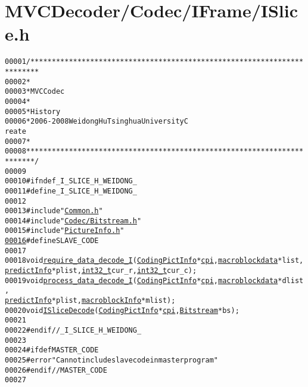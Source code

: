 \hypertarget{_i_slice_8h_source}{
\section{MVCDecoder/Codec/IFrame/ISlice.h}
}


\begin{footnotesize}\begin{alltt}
00001 \textcolor{comment}{/************************************************************************}
00002 \textcolor{comment}{ *}
00003 \textcolor{comment}{ * MVC Codec}
00004 \textcolor{comment}{ * }
00005 \textcolor{comment}{ * History}
00006 \textcolor{comment}{ * 2006-2008            Weidong Hu              Tsinghua University             C
      reate}
00007 \textcolor{comment}{ * }
00008 \textcolor{comment}{ ************************************************************************/}
00009 
00010 \textcolor{preprocessor}{#ifndef \_I\_SLICE\_H\_WEIDONG\_}
00011 \textcolor{preprocessor}{}\textcolor{preprocessor}{#define \_I\_SLICE\_H\_WEIDONG\_}
00012 \textcolor{preprocessor}{}
00013 \textcolor{preprocessor}{#include "\hyperlink{_common_8h}{Common.h}"}
00014 \textcolor{preprocessor}{#include "\hyperlink{_bitstream_8h}{Codec/Bitstream.h}"}
00015 \textcolor{preprocessor}{#include "\hyperlink{_picture_info_8h}{PictureInfo.h}"}
\hypertarget{_i_slice_8h_source_l00016}{}\hyperlink{_i_slice_8h_a995f6a4907273b8d56b6543ab1a57d17}{00016} \textcolor{preprocessor}{#define SLAVE\_CODE}
00017 \textcolor{preprocessor}{}
00018 \textcolor{keywordtype}{void} \hyperlink{_i_slice_8cpp_a62bde0c28d855f00622a319f1be6dfd2}{require_data_decode_I}(\hyperlink{struct_coding_pict_info}{CodingPictInfo} *\hyperlink{structtag__macroblock__info_ae7a0c6b68c7cbc0ffb1a82799eb386ef}{cpi}, \hyperlink{structmacroblockdata}{macroblockdata} *list, 
      \hyperlink{structpredict_info}{predictInfo} *plist, \hyperlink{_types_8h_a115ba3a1b24a8702355c5dbd61ce01e0}{int32_t} cur\_r, \hyperlink{_types_8h_a115ba3a1b24a8702355c5dbd61ce01e0}{int32_t} cur\_c);
00019 \textcolor{keywordtype}{void} \hyperlink{_i_slice_8cpp_a23c43acab8cba26c6a4938028715f817}{process_data_decode_I}(\hyperlink{struct_coding_pict_info}{CodingPictInfo} *\hyperlink{structtag__macroblock__info_ae7a0c6b68c7cbc0ffb1a82799eb386ef}{cpi}, \hyperlink{structmacroblockdata}{macroblockdata} *dlist, 
      \hyperlink{structpredict_info}{predictInfo} *plist, \hyperlink{structmacroblock_info}{macroblockInfo} *mlist);
00020 \textcolor{keywordtype}{void} \hyperlink{_i_slice_8cpp_a3d8b6dcdaff59baf9c7b27ae426f0a5a}{ISliceDecode}(\hyperlink{struct_coding_pict_info}{CodingPictInfo} *\hyperlink{structtag__macroblock__info_ae7a0c6b68c7cbc0ffb1a82799eb386ef}{cpi}, \hyperlink{struct_bitstream}{Bitstream} *bs);
00021 
00022 \textcolor{preprocessor}{#endif //\_I\_SLICE\_H\_WEIDONG\_}
00023 \textcolor{preprocessor}{}
00024 \textcolor{preprocessor}{#ifdef MASTER\_CODE}
00025 \textcolor{preprocessor}{}\textcolor{preprocessor}{#error "Can not include slave code in master program"}
00026 \textcolor{preprocessor}{}\textcolor{preprocessor}{#endif // MASTER\_CODE}
00027 \textcolor{preprocessor}{}
\end{alltt}\end{footnotesize}
